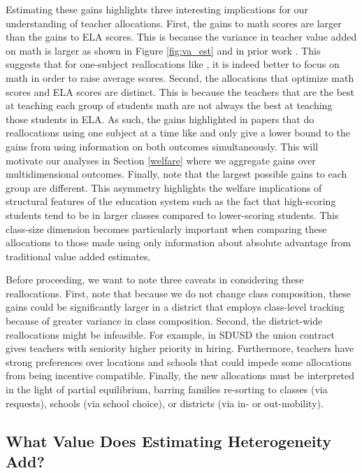 \documentclass[12pt]{article}
\theoremstyle{definition}
\theoremstyle{definition}
\theoremstyle{definition}
\theoremstyle{definition}
\begin{document}
Estimating these gains highlights three interesting implications for our understanding of teacher allocations. First, the gains to math scores are larger than the gains to ELA scores. This is because the variance in teacher value added on math is larger as shown in Figure \ref{fig:va_est} and in prior work \citep[e.g.,][]{chetty2014measuring1}. This suggests that for one-subject reallocations like \citet{bates2022teacher}, it is indeed better to focus on math in order to raise average scores. Second, the allocations that optimize math scores and ELA scores are distinct. This is because the teachers that are the best at teaching each group of students math are not always the best at teaching those students in ELA. As such, the gains highlighted in papers that do reallocations using one subject at a time like \citet{Delgado2020} and \citet{bates2022teacher} only give a lower bound to the gains from using information on both outcomes simultaneously. This will motivate our analyses in Section \ref{welfare} where we aggregate gains over multidimensional outcomes. Finally, note that the largest possible gains to each group are different. This asymmetry highlights the welfare implications of structural features of the education system such as the fact that high-scoring students tend to be in larger classes compared to lower-scoring students. This class-size dimension becomes particularly important when comparing these allocations to those made using only information about absolute advantage from traditional value added estimates.

Before proceeding, we want to note three caveats in considering these reallocations. First, note that because we do not change class composition, these gains could be significantly larger in a district that employs class-level tracking because of greater variance in class composition. Second, the district-wide reallocations might be infeasible. For example, in SDUSD the union contract gives teachers with seniority higher priority in hiring. Furthermore, teachers have strong preferences over locations \citep{boyd2005a} and schools \citep{bates2022teacher} that could impede some allocations from being incentive compatible. Finally, the new allocations must be interpreted in the light of partial equilibrium, barring families re-sorting to classes (via requests), schools (via school choice), or districts (via in- or out-mobility).

\subsection{What Value Does Estimating Heterogeneity Add?}
\end{document}
